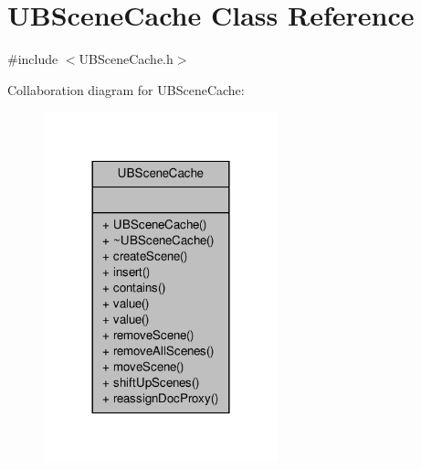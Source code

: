 \hypertarget{class_u_b_scene_cache}{\section{U\-B\-Scene\-Cache Class Reference}
\label{d2/d79/class_u_b_scene_cache}
}


{\ttfamily \#include $<$U\-B\-Scene\-Cache.\-h$>$}



Collaboration diagram for U\-B\-Scene\-Cache\-:
\nopagebreak
\begin{figure}[H]
\begin{center}
\leavevmode
\includegraphics[width=192pt]{d0/dda/class_u_b_scene_cache__coll__graph}
\end{center}
\end{figure}
